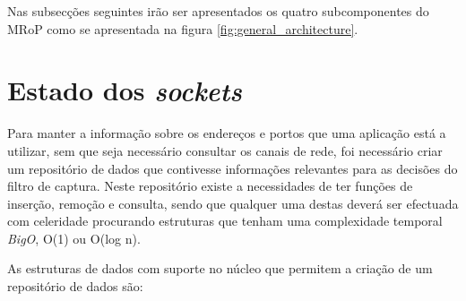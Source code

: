 Nas subsecções seguintes irão ser apresentados os quatro subcomponentes do MRoP como se apresentada na figura \ref{fig:general_architecture}.


\section{Estado dos \textit{sockets}}

Para manter a informação sobre os endereços e portos que uma aplicação está a utilizar, sem que seja necessário consultar os canais de rede, foi necessário criar um repositório de dados que contivesse informações relevantes para as decisões do filtro de captura.
Neste repositório existe a necessidades de ter funções de inserção, remoção e consulta, sendo que qualquer uma destas deverá ser efectuada com celeridade procurando estruturas que tenham uma complexidade temporal \textit{BigO}, O(1) ou O(log n).

As estruturas de dados com suporte no núcleo que permitem a criação de um repositório de dados são:


